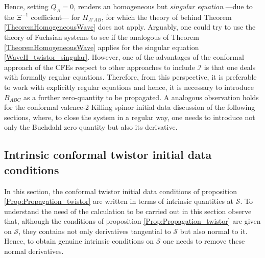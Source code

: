 \documentclass[10pt,a4paper]{article}
\theoremstyle{plain}
\begin{document}
{%
Hence, setting $Q_{A}=0$, renders an homogeneous but
\emph{singular equation} ---due to the $\Xi^{-1}$ coefficient---
for $H_{A'AB}$, for which the theory of behind Theorem
\ref{TheoremHomogeneousWave} does not apply. Arguably, one could try
to use the theory of Fuchsian systems to see if the analogous of
Theorem \ref{TheoremHomogeneousWave} applies for the singular equation
\eqref{WaveH_twistor_singular}.  However, one of the advantages of the
conformal approach of the CFEs respect to other approaches to include
$\mathscr{I}$ is that one deals with formally regular equations.
Therefore, from this perspective,
it is preferable to work with explicitly regular equations and hence,
it is necessary to introduce $B_{ABC}$ as a further zero-quantity to
be propagated.  A analogous observation holds for the conformal valence-2
Killing spinor initial data discussion of the following sections,
where, to close the system in a regular way, one needs to introduce not
only the Buchdahl zero-quantity but also its derivative.





\subsection{Intrinsic conformal twistor initial data conditions}

In this section, the conformal twistor initial data conditions of
proposition \ref{Prop:Propagation_twistor} are written in terms of
intrinsic quantities at $\mathcal{S}$.  To understand the need of the
calculation to be carried out in this section observe that, although
the conditions of proposition \ref{Prop:Propagation_twistor} are given
on $\mathcal{S}$, they contains not only derivatives tangential to
$\mathcal{S}$ but also normal to it. Hence, to obtain genuine
intrinsic conditions on $\mathcal{S}$ one needs to remove these normal
derivatives.

}
\end{document}
